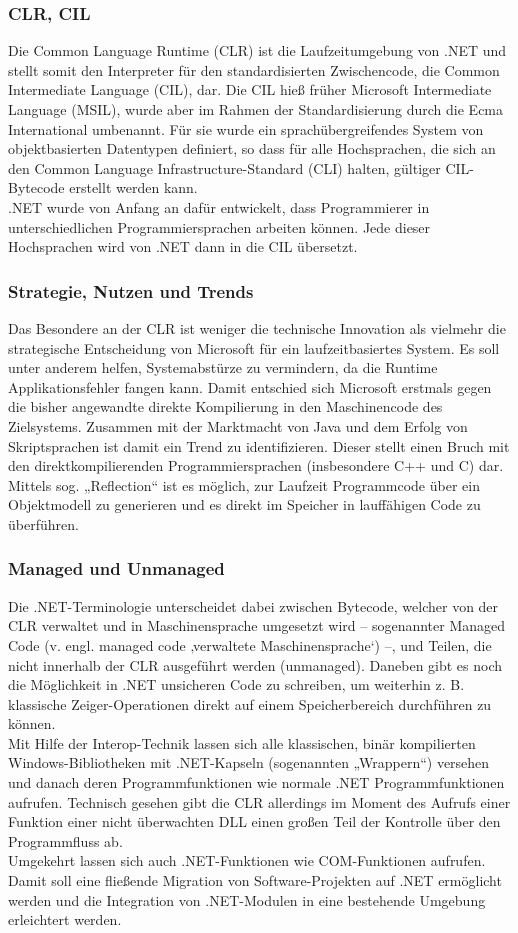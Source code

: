 \documentclass[10pt]{article}
\begin{document}
\subsubsection{CLR, CIL}
Die Common Language Runtime (CLR) ist die Laufzeitumgebung von .NET und stellt somit den Interpreter für den standardisierten Zwischencode, die Common Intermediate Language (CIL), dar. Die CIL hieß früher Microsoft Intermediate Language (MSIL), wurde aber im Rahmen der Standardisierung durch die Ecma International umbenannt. Für sie wurde ein sprachübergreifendes System von objektbasierten Datentypen definiert, so dass für alle Hochsprachen, die sich an den Common Language Infrastructure-Standard (CLI) halten, gültiger CIL-Bytecode erstellt werden kann. \\
.NET wurde von Anfang an dafür entwickelt, dass Programmierer in unterschiedlichen Programmiersprachen arbeiten können. Jede dieser Hochsprachen wird von .NET dann in die CIL übersetzt.
\subsubsection{Strategie, Nutzen und Trends}
Das Besondere an der CLR ist weniger die technische Innovation als vielmehr die strategische Entscheidung von Microsoft für ein laufzeitbasiertes System. Es soll unter anderem helfen, Systemabstürze zu vermindern, da die Runtime Applikationsfehler fangen kann. Damit entschied sich Microsoft erstmals gegen die bisher angewandte direkte Kompilierung in den Maschinencode des Zielsystems. Zusammen mit der Marktmacht von Java und dem Erfolg von Skriptsprachen ist damit ein Trend zu identifizieren. Dieser stellt einen Bruch mit den direktkompilierenden Programmiersprachen (insbesondere C++ und C) dar. \\
Mittels sog. „Reflection“ ist es möglich, zur Laufzeit Programmcode über ein Objektmodell zu generieren und es direkt im Speicher in lauffähigen Code zu überführen.
\subsubsection{Managed und Unmanaged}
Die .NET-Terminologie unterscheidet dabei zwischen Bytecode, welcher von der CLR verwaltet und in Maschinensprache umgesetzt wird – sogenannter Managed Code (v. engl. managed code ‚verwaltete Maschinensprache‘) –, und Teilen, die nicht innerhalb der CLR ausgeführt werden (unmanaged). Daneben gibt es noch die Möglichkeit in .NET unsicheren Code zu schreiben, um weiterhin z. B. klassische Zeiger-Operationen direkt auf einem Speicherbereich durchführen zu können. \\
Mit Hilfe der Interop-Technik lassen sich alle klassischen, binär kompilierten Windows-Bibliotheken mit .NET-Kapseln (sogenannten „Wrappern“) versehen und danach deren Programmfunktionen wie normale .NET Programmfunktionen aufrufen. Technisch gesehen gibt die CLR allerdings im Moment des Aufrufs einer Funktion einer nicht überwachten DLL einen großen Teil der Kontrolle über den Programmfluss ab. \\
Umgekehrt lassen sich auch .NET-Funktionen wie COM-Funktionen aufrufen. Damit soll eine fließende Migration von Software-Projekten auf .NET ermöglicht werden und die Integration von .NET-Modulen in eine bestehende Umgebung erleichtert werden.
\end{document}
